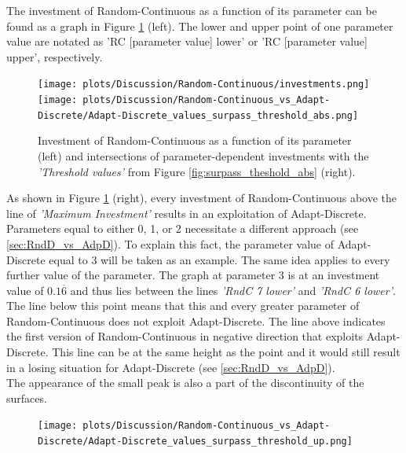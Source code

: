 \documentclass[11pt]{article}
\begin{document}
	\noindent
	The investment of Random-Continuous as a function of its parameter can be found as a graph in Figure \ref{fig:RC_investm} (left).
	The lower and upper point of one parameter value are notated as 'RC [parameter value] lower' or  'RC [parameter value] upper', respectively.

	\begin{figure}[h]
		\centering
		\texttt{[image: plots/Discussion/Random-Continuous/investments.png]}
		\texttt{[image: plots/Discussion/Random-Continuous\_vs\_Adapt-Discrete/Adapt-Discrete\_values\_surpass\_threshold\_abs.png]}
		\caption{Investment of Random-Continuous as a function of its parameter (left) and intersections of parameter-dependent investments with the \emph{'Threshold values'} from Figure \ref{fig:surpass_theshold_abs} (right).}
		\label{fig:RC_investm}
	\end{figure}

	\noindent
	As shown in Figure \ref{fig:RC_investm} (right), every investment of Random-Continuous above the line of \textit{'Maximum Investment'} results in an exploitation of Adapt-Discrete.
	Parameters equal to either 0, 1, or 2 necessitate a different approach (see \ref{sec:RndD_vs_AdpD}).
	To explain this fact, the parameter value of Adapt-Discrete equal to 3 will be taken as an example.
	The same idea applies to every further value of the parameter.
	The graph at parameter 3 is at an investment value of $0.1\overline{6}$ and thus lies between the lines \textit{'RndC 7 lower'} and \textit{'RndC 6 lower'}.
	The line below this point means that this and every greater parameter of Random-Continuous does not exploit Adapt-Discrete.
	The line above indicates the first version of Random-Continuous in negative direction that exploits Adapt-Discrete.
	This line can be at the same height as the point and it would still result in a losing situation for Adapt-Discrete (see \ref{sec:RndD_vs_AdpD}).\\
	
	\noindent 
	The appearance of the small peak is also a part of the discontinuity of the surfaces.

	\begin{figure}[h]
		\centering
		\texttt{[image: plots/Discussion/Random-Continuous\_vs\_Adapt-Discrete/Adapt-Discrete\_values\_surpass\_threshold\_up.png]}
		\caption{}
		\label{fig:RndC_AdpD_peak}
	\end{figure}
\end{document}
